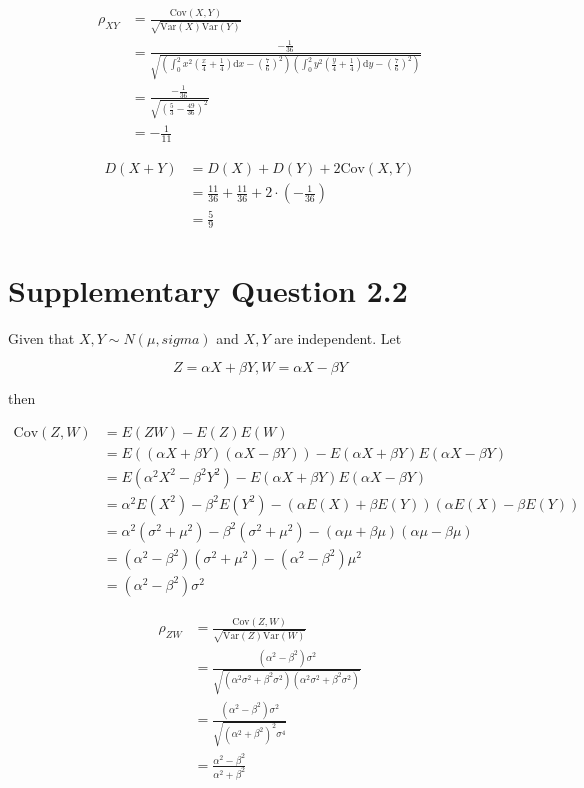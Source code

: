 \documentclass[a4paper, UTF-8]{article}
\theoremstyle{plain}
\begin{document}
\begin{align*}
\rho_{XY} &= \frac{\text{Cov}(X, Y)}{\sqrt{\text{Var}(X)\text{Var}(Y)}} \\ 
&= \frac{-\frac{1}{36}}{\sqrt{\left(\int_{0}^{2} x^2\left(\frac{x}{4} + \frac{1}{4}\right) \mathrm{d}x - \left(\frac{7}{6}\right)^2\right)\left(\int_{0}^{2} y^2\left(\frac{y}{4} + \frac{1}{4}\right) \mathrm{d}y - \left(\frac{7}{6}\right)^2\right)}} \\ 
&= \frac{-\frac{1}{36}}{\sqrt{\left(\frac{5}{3} - \frac{49}{36}\right)^2}} \\ 
& = -\frac{1}{11}
\end{align*}

\begin{align*}
D(X + Y) &= D(X) + D(Y) + 2\text{Cov}(X, Y) \\ 
&= \frac{11}{36} + \frac{11}{36} + 2\cdot\left(-\frac{1}{36}\right)\\ &= \frac{5}{9}
\end{align*}

\section{Supplementary Question 2.2}

Given that $X, Y \sim N(\mu, sigma)$ and $X, Y$ are independent. Let

$$
Z = \alpha X + \beta Y, W = \alpha X - \beta Y
$$

then 

\begin{align*}
\text{Cov}(Z, W) &= E(ZW) - E(Z)E(W) \\ 
&= E((\alpha X + \beta Y)(\alpha X - \beta Y)) - E(\alpha X + \beta Y)E(\alpha X - \beta Y) \\ 
&= E(\alpha^2 X^2 - \beta^2 Y^2) - E(\alpha X + \beta Y)E(\alpha X - \beta Y) \\
&= \alpha^2 E(X^2) - \beta^2 E(Y^2) - (\alpha E(X) + \beta E(Y))(\alpha E(X) - \beta E(Y)) \\
&= \alpha^2 (\sigma^2 + \mu^2) - \beta^2 (\sigma^2 + \mu^2) - (\alpha \mu + \beta \mu)(\alpha \mu - \beta \mu) \\
&= (\alpha^2 - \beta^2)(\sigma^2 + \mu^2) - (\alpha^2 - \beta^2)\mu^2 \\
&= (\alpha^2 - \beta^2)\sigma^2
\end{align*}

\begin{align*} 
\rho_{ZW} &= \frac{\text{Cov}(Z, W)}{\sqrt{\text{Var}(Z)\text{Var}(W)}} \\
&= \frac{(\alpha^2 - \beta^2)\sigma^2}{\sqrt{(\alpha^2 \sigma^2 + \beta^2 \sigma^2)(\alpha^2 \sigma^2 + \beta^2 \sigma^2)}} \\
&= \frac{(\alpha^2 - \beta^2)\sigma^2}{\sqrt{(\alpha^2 + \beta^2)^2 \sigma^4}} \\
&= \frac{\alpha^2 - \beta^2}{\alpha^2 + \beta^2}
\end{align*}
\end{document}
